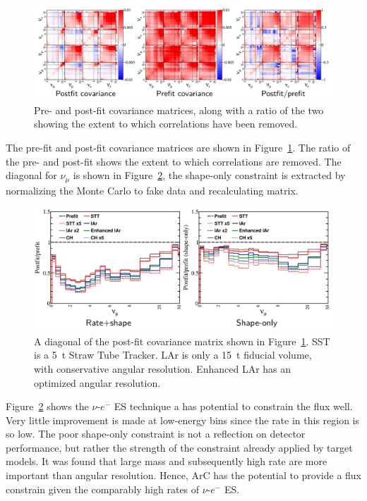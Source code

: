 \documentclass[a4paper]{article}
\begin{document}
\begin{figure}[tbp]
	\centering
	\includegraphics[width=\textwidth]{Figures/Covarience}
	\caption{Pre- and post-fit covariance matrices, along with a ratio of the two showing the extent to which correlations have been removed.}
	\label{fig:cov}
\end{figure}

The pre-fit and post-fit covariance matrices are shown in Figure~\ref{fig:cov}. 
The ratio of the pre- and post-fit shows the extent to which correlations are removed. 
The diagonal for $\nu_\mu$ is shown in Figure~\ref{fig:nue_con}, the shape-only constraint is extracted by normalizing the Monte Carlo to fake data and recalculating matrix. 

\begin{figure}[tbp]
	\centering
	\includegraphics[width=\textwidth]{Figures/nue_conclusion}
	\caption{A diagonal of the post-fit covariance matrix shown in Figure~\ref{fig:cov}. SST is a 5~t Straw Tube Tracker. LAr is only a 15~t fiducial volume, with conservative angular resolution. Enhanced LAr has an optimized angular resolution.}
	\label{fig:nue_con}
\end{figure}

Figure~\ref{fig:nue_con} shows the $\nu$-$e^-$ ES technique a has potential to constrain the flux well.
Very little improvement is made at low-energy bins since the rate in this region is so low. 
The poor shape-only constraint is not a reflection on detector performance, but rather the strength of the constraint already applied by target models.
It was found that large mass and subsequently high rate are more important than angular resolution.
Hence, ArC has the potential to provide a flux constrain given the comparably high rates of $\nu$-$e^-$ ES.  
\end{document}
